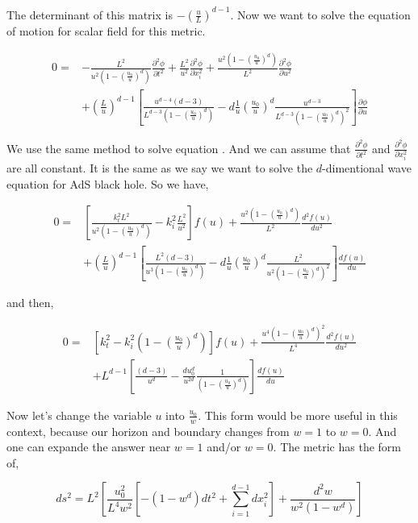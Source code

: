 The determinant of this matrix is $-(\frac{u}{L})^{d-1}$. Now we want to solve the equation of motion for scalar field for this metric.

\begin{align} \label{eq:BlackHoleAdSMotionEquationu0/u}
   0 =& - \frac{L^2}{u^2 (1-(\frac{u_0}{u})^d)}\frac{\partial^2 \phi}{\partial t^2} + \frac{L^2}{u^2}\frac{\partial^2 \phi}{\partial x_i^2} + \frac{u^2 (1-(\frac{u_0}{u})^d)}{L^2}\frac{\partial^2 \phi}{\partial u^2} \nonumber\\
   & + (\frac{L}{u})^{d-1} \left[ \frac{u^{d-4}(d-3)}{L^{d-3} (1-(\frac{u_0}{u})^d)} - d \frac{1}{u} (\frac{u_0}{u})^{d} \frac{u^{d-3}}{L^{d-3} (1-(\frac{u_0}{u})^d)^2} \right] \frac{\partial \phi}{\partial u}
\end{align}

We use the same method to solve equation \label{eq:BlackHoleAdSMotionEquationu0/u}. And we can assume that $\frac{\partial^2 \phi}{\partial t^2}$ and $\frac{\partial^2 \phi}{\partial x_i^2}$ are all constant. It is the same as we say we want to solve the $d$-dimentional wave equation for AdS black hole. So we have,

\begin{align}
   0 =& \left[ \frac{k_t^2 L^2}{u^2 (1-(\frac{u_0}{u})^d)} - k_i^2 \frac{L^2}{u^2} \right]f(u) + \frac{u^2 (1-(\frac{u_0}{u})^d)}{L^2}\frac{d^2 f(u)}{d u^2} \nonumber\\
   & + (\frac{L}{u})^{d-1} \left[ \frac{L^{2}(d-3)}{u^{3} (1-(\frac{u_0}{u})^d)} - d \frac{1}{u} (\frac{u_0}{u})^{d} \frac{L^{2}}{u^{2} (1-(\frac{u_0}{u})^d)^2} \right] \frac{d f(u)}{d u}
\end{align}

and then, 

\begin{align}
   0 =& \left[ k_t^2 - k_i^2 (1-(\frac{u_0}{u})^d) \right] f(u) + \frac{u^4 (1-(\frac{u_0}{u})^d)^2}{L^4}\frac{d^2 f(u)}{d u^2} \nonumber\\
   & + L^{d-1} \left[ \frac{(d-3)}{u^d} - \frac{du_0^d}{u^{2d}} \frac{1}{(1-(\frac{u_0}{u})^d)} \right] \frac{d f(u)}{d u}
\end{align}
 
Now let's change the variable $u$ into $\frac{u_0}{w}$. This form would be more useful in this context, because our horizon and boundary changes from $w=1$ to $w=0$. And one can expande the answer near $w=1$ and/or $w=0$. The metric has the form of,

\begin{equation}
    ds^2 = L^2 \left[ \frac{u_0^2}{L^4w^2} \left[ -(1-w^d) dt^2 + \sum\limits_{i=1}^{d-1} dx_i^2 \right] + \frac{d^2w}{w^2 (1-w^d)} \right]
\end{equation}

